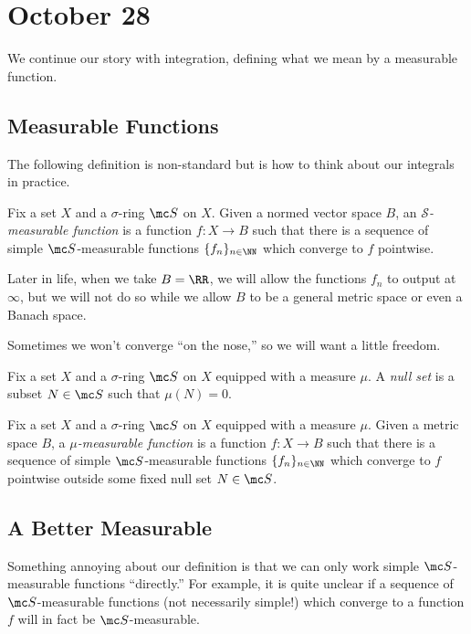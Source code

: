 \documentclass[../notes.tex]{subfiles}
\begin{document}
\section{October 28}

We continue our story with integration, defining what we mean by a measurable function.

\subsection{Measurable Functions}
The following definition is non-standard but is how to think about our integrals in practice.
\begin{definition}
	Fix a set $X$ and a $\sigma$-ring $\mc S$ on $X$. Given a normed vector space $B$, an \textit{$\mathcal S$-measurable function} is a function $f\colon X\to B$ such that there is a sequence of simple $\mc S$-measurable functions $\{f_n\}_{n\in\NN}$ which converge to $f$ pointwise.
\end{definition}
\begin{remark}
	Later in life, when we take $B=\RR$, we will allow the functions $f_n$ to output at $\infty$, but we will not do so while we allow $B$ to be a general metric space or even a Banach space.
\end{remark}
Sometimes we won't converge ``on the nose,'' so we will want a little freedom.
\begin{definition}
	Fix a set $X$ and a $\sigma$-ring $\mc S$ on $X$ equipped with a measure $\mu$. A \textit{null set} is a subset $N\in\mc S$ such that $\mu(N)=0$.
\end{definition}
\begin{definition}
	Fix a set $X$ and a $\sigma$-ring $\mc S$ on $X$ equipped with a measure $\mu$. Given a metric space $B$, a \textit{$\mu$-measurable function} is a function $f\colon X\to B$ such that there is a sequence of simple $\mc S$-measurable functions $\{f_n\}_{n\in\NN}$ which converge to $f$ pointwise outside some fixed null set $N\in\mc S$.
\end{definition}

\subsection{A Better Measurable}
Something annoying about our definition is that we can only work simple $\mc S$-measurable functions ``directly.'' For example, it is quite unclear if a sequence of $\mc S$-measurable functions (not necessarily simple!) which converge to a function $f$ will in fact be $\mc S$-measurable.
\end{document}
